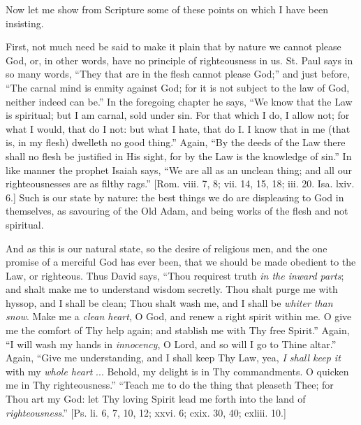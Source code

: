 Now let me show from Scripture some of these points on which I have
been insisting.

First, not much need be said to make it plain that by nature we
cannot please God, or, in other words, have no principle of
righteousness in us. St. Paul says in so many words, ``They that
are in the flesh cannot please God;'' and just before, ``The
carnal mind is enmity against God; for it is not subject to the law of
God, neither indeed can be.'' In the foregoing chapter he says,
``We know that the Law is spiritual; but I am carnal, sold under
sin. For that which I do, I allow not; for what I would, that do I
not: but what I hate, that do I. I know that in me (that is, in my
flesh) dwelleth no good thing.'' Again, ``By the deeds of the
Law there shall no flesh be justified in His sight, for by the Law is
the knowledge of sin.'' In like manner the prophet Isaiah says,
``We are all as an unclean thing; and all our righteousnesses are
as filthy rags.'' [Rom. viii. 7, 8; vii. 14, 15, 18; iii. 20. Isa.
lxiv. 6.] Such is our state by nature: the best things we do are
displeasing to God in themselves, as savouring of the Old Adam, and
being works of the flesh and not spiritual.

And as this is our natural state, so the desire of religious men,
and the one promise of a merciful God has ever been, that we should be
made obedient to the Law, or righteous. Thus David says, ``Thou
requirest truth \emph{in the inward parts}; and shalt make me to
understand wisdom secretly. Thou shalt purge me with hyssop, and I
shall be clean; Thou shalt wash me, and I shall be \emph{whiter than snow}.
Make me a \emph{clean heart}, O God, and renew a right spirit within
me. O give me the comfort of Thy help again; and stablish me with Thy
free Spirit.'' Again, ``I will wash my hands in \emph{innocency},
O Lord, and so will I go to Thine altar.'' Again, ``Give me
understanding, and I shall keep Thy Law, yea, \emph{I shall keep it}
with my \emph{whole heart} ... Behold, my delight is in Thy
commandments. O quicken me in Thy righteousness.'' ``Teach me
to do the thing that pleaseth Thee; for Thou art my God: let Thy
loving Spirit lead me forth into the land of \emph{righteousness}.''
[Ps. li. 6, 7, 10, 12; xxvi. 6; cxix. 30, 40; cxliii. 10.]

